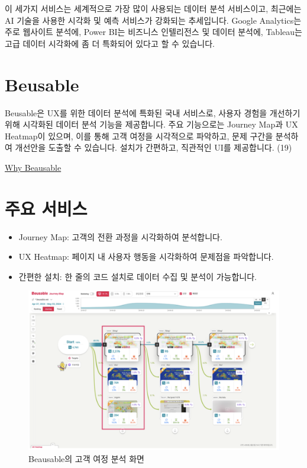 \documentclass[
  letterpaper,
]{book}
\providecommand{\tightlist}{%
  \setlength{\itemsep}{0pt}\setlength{\parskip}{0pt}}\usepackage{longtable,booktabs,array}
\begin{document}
이 세가지 서비스는 세계적으로 가장 많이 사용되는 데이터 분석 서비스이고,
최근에는 AI 기술을 사용한 시각화 및 예측 서비스가 강화되는 추세입니다.
Google Analytics는 주로 웹사이트 분석에, Power BI는 비즈니스 인텔리전스
및 데이터 분석에, Tableau는 고급 데이터 시각화에 좀 더 특화되어 있다고
할 수 있습니다.

\section{Beusable}\label{beusable}

Beusable은 UX를 위한 데이터 분석에 특화된 국내 서비스로, 사용자 경험을
개선하기 위해 시각화된 데이터 분석 기능을 제공합니다. 주요 기능으로는
Journey Map과 UX Heatmap이 있으며, 이를 통해 고객 여정을 시각적으로
파악하고, 문제 구간을 분석하여 개선안을 도출할 수 있습니다. 설치가
간편하고, 직관적인 UI를 제공합니다. (19)

\href{https://www.beusable.net/ko/}{Why Beausable}

\section{주요 서비스}\label{uxc8fcuxc694-uxc11cuxbe44uxc2a4-3}

\begin{itemize}
\tightlist
\item
  Journey Map: 고객의 전환 과정을 시각화하여 분석합니다.
\item
  UX Heatmap: 페이지 내 사용자 행동을 시각화하여 문제점을 파악합니다.
\item
  간편한 설치: 한 줄의 코드 설치로 데이터 수집 및 분석이 가능합니다.
\end{itemize}

\begin{figure}[H]

{\centering \includegraphics{img/fig20.png}

}

\caption{Beausable의 고객 여정 분석 화면}

\end{figure}%
\end{document}
